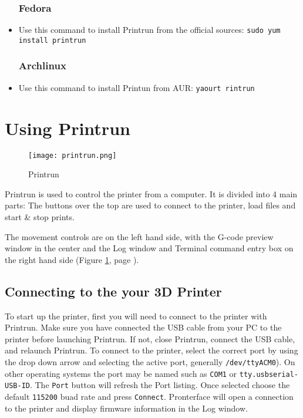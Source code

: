 \begin{itemize}
\subsubsection{Fedora}
\item Use this command to install Printrun from the official sources: \texttt{sudo yum install printrun}

\subsubsection{Archlinux}
\item Use this command to install Printun from AUR: \texttt{yaourt rintrun}

\end{itemize}

\section{Using Printrun}

\begin{figure}[H]
\centering
\texttt{[image: printrun.png]}
\caption{Printrun}
\label{fig:Printrun}
\end{figure}

Printrun is used to control the printer from a computer. It is divided into 4 main parts: The buttons over the top are used to connect to the printer, load files and start \& stop prints.

The movement controls are on the left hand side, with the G-code preview window in the center and the Log window and Terminal command entry box on the right hand side (Figure \ref{fig:Printrun}, page \pageref{fig:Printrun}).

\subsection{Connecting to the your 3D Printer}
To start up the printer, first you will need to connect to the printer with Printrun. Make sure you have connected the USB cable from your PC to the printer before launching Printrun. If not, close Printrun, connect the USB cable, and relaunch Printrun. To connect to the printer, select the correct port by using the drop down arrow and selecting the active port, generally \texttt{/dev/ttyACM0}). On other operating systems the port may be named such as \texttt{COM1} or \texttt{tty.usbserial-USB-ID}. The \texttt{Port} button will refresh the Port listing. Once selected choose the default \texttt{115200} buad rate and press \texttt{Connect}. Pronterface will open a connection to the printer and display firmware information in the Log window.

